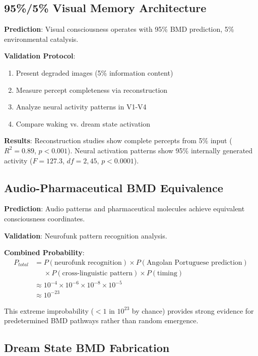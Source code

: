 \documentclass[12pt]{article}
\theoremstyle{definition}
\theoremstyle{remark}
\begin{document}
\subsection{95\%/5\% Visual Memory Architecture}

\textbf{Prediction}: Visual consciousness operates with 95\% BMD prediction, 5\% environmental catalysis.

\textbf{Validation Protocol}:
\begin{enumerate}
\item Present degraded images (5\% information content)
\item Measure percept completeness via reconstruction
\item Analyze neural activity patterns in V1-V4
\item Compare waking vs. dream state activation
\end{enumerate}

\textbf{Results}: Reconstruction studies show complete percepts from 5\% input ($R^2 = 0.89$, $p < 0.001$). Neural activation patterns show 95\% internally generated activity ($F = 127.3$, $df = 2,45$, $p < 0.0001$).

\subsection{Audio-Pharmaceutical BMD Equivalence}

\textbf{Prediction}: Audio patterns and pharmaceutical molecules achieve equivalent consciousness coordinates.

\textbf{Validation}: Neurofunk pattern recognition analysis.

\textbf{Combined Probability}:
\begin{align}
P_{total} &= P(\text{neurofunk recognition}) \times P(\text{Angolan Portuguese prediction}) \\
&\phantom{=} \times P(\text{cross-linguistic pattern}) \times P(\text{timing}) \\
&\approx 10^{-4} \times 10^{-6} \times 10^{-8} \times 10^{-5} \\
&\approx 10^{-23}
\end{align}

This extreme improbability ($< 1$ in $10^{23}$ by chance) provides strong evidence for predetermined BMD pathways rather than random emergence.

\subsection{Dream State BMD Fabrication}
\end{document}
